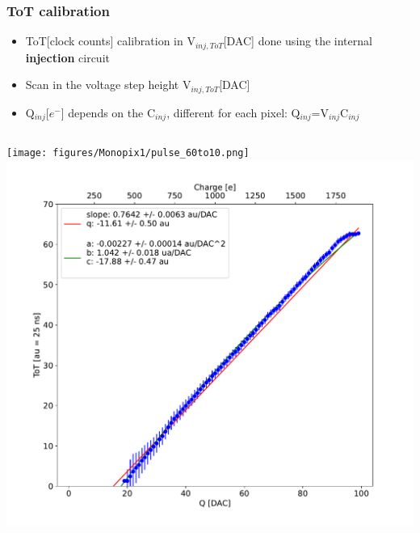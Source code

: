     \begin{frame}
        \frametitle{ToT calibration}
        \begin{itemize}
            \item ToT[clock counts] calibration in V$_{inj, ToT}$[DAC] done using the internal \textbf{injection} circuit
            \item Scan in the voltage step height V$_{inj, ToT}$[DAC]
            \item Q$_{inj}$[$e^-$] depends on the C$_{inj}$, different for each pixel: Q$_{inj}$=V$_{inj}$C$_{inj}$\\  
        \end{itemize}
        \medskip
        \begin{columns}
                \texttt{[image: figures/Monopix1/pulse\_60to10.png]}
                \includegraphics[width=1.1\linewidth]{figures/charaterization/ToT_injection.pdf} 
        \end{columns}
    \end{frame}    

